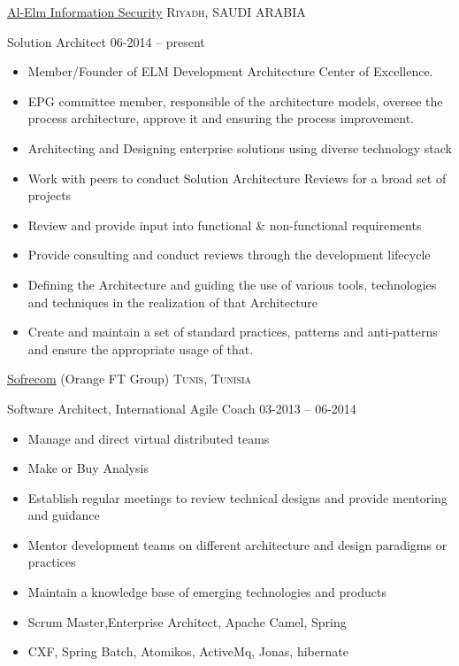 \documentclass[10pt,a4paper]{article}
\begin{document}
\headedsection  %
  {\href{http://www.elm.sa/en/Pages/default.aspx}{Al-Elm Information Security}}
  {\textsc{Riyadh, SAUDI ARABIA}} {%
  \headedsubsection
    {Solution Architect}
    {06-2014 -- present}
    {\begin{itemize} \itemsep -2pt  %
 \item  Member/Founder of ELM Development Architecture Center of Excellence.
 \item EPG committee member, responsible of  the architecture models, oversee the process architecture, approve it and ensuring the process improvement.
 \item Architecting and Designing enterprise solutions using diverse technology stack
 \item Work with peers to conduct Solution Architecture Reviews for a broad set of projects
 \item  Review and provide input into functional \& non-functional requirements
 \item  Provide consulting and conduct reviews through the development lifecycle
 \item  Defining the Architecture and guiding the use of various tools, technologies and techniques in the realization of that Architecture
 \item  Create and maintain a set of standard practices, patterns and anti-patterns and ensure the appropriate usage of that.
 \end{itemize}}
}


\headedsection  %
  {\href{http://www.sofrecom.com/en}{Sofrecom} (Orange FT Group)}
  {\textsc{Tunis, Tunisia}} {%
  \headedsubsection
    {Software Architect, International Agile Coach}
    {03-2013 -- 06-2014}
    {
\begin{itemize} \itemsep -2pt  %
\item Manage and direct virtual distributed teams
\item Make or Buy Analysis
\item Establish regular meetings to review technical designs and provide mentoring and guidance
\item Mentor development teams on different architecture and design paradigms or practices
\item Maintain a knowledge base of emerging technologies and products
\item Scrum Master,Enterprise Architect, Apache Camel, Spring
\item CXF, Spring Batch, Atomikos, ActiveMq, Jonas, hibernate
\end{itemize}
}}
\end{document}
